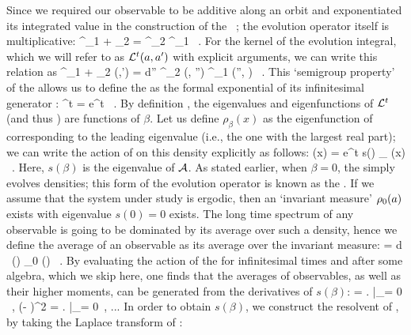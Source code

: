 Since we required our observable to be additive along an orbit and
exponentiated its integrated value in the construction of the \evOper\
; the evolution operator itself is multiplicative:
\beq
    \Lop^{\zeit_1 + \zeit_2} = \Lop^{\zeit_2} \Lop^{\zeit_1} \, .
    \label{eq-SemiGroup}
\eeq
For the kernel of the evolution integral, which we will refer to as
${\cal L}^{t} (a, a')$ with explicit arguments, we can write this relation
as
\beq
	\Lop^{\zeit_1 + \zeit_2} (\ssp,\ssp') =
    \int d\ssp'' \Lop^{\zeit_2} (\ssp, \ssp'')
                   \Lop^{\zeit_1} (\ssp'', \ssp) \, .
	\label{eq-SemiGroupKernel}
\eeq
This `semigroup property'  of the {\evOper} allows us to
define the {\evOper} as the formal exponential of its infinitesimal generator
\Aop :
\beq
	\Lop^t = e^{\Aop t} \, .
	\label{eq-EvOpExp}
\eeq
By definition , the eigenvalues and eigenfunctions of ${\cal L}^t$ (and
thus \Aop ) are functions of $\beta$. Let us define $\rho_{\beta} (x)$ as the
eigenfunction of  corresponding to the leading eigenvalue (i.e., the one with the
largest real part); we can write the action of \refeq{e-EvOper} on this density
explicitly as follows:
\beq
     (x) = e^{t s(\beta )} \rho_{\beta} (x)
    \, .
    \label{eq-EigenvalueRel}
\eeq
Here, $s(\beta)$ is the eigenvalue of ${\cal A}$. As stated earlier, when
$\beta = 0$, the {\evOper} simply evolves densities; this form of the evolution
operator is known as the {\FPoper}. If we assume that the system under study is ergodic,
then an `invariant measure' $\rho_0(a)$ exists with eigenvalue
$s(0) = 0$ exists. The long time spectrum of any observable is going to be dominated by
its average over such a density, hence we define the average of an observable
as its average over the invariant measure:
\beq
    \langle \obser \rangle = \int d \ssp \, \obser(\ssp) \rho_0 (\ssp) \, .
    \label{e-obserAvg}
\eeq
By evaluating the action of the {\evOper}  for infinitesimal
times and after some algebra, which we skip here, one finds that the
averages of observables, as well as their higher moments, can be generated from the
derivatives of $s(\beta)$:
\beq
    \langle \obser \rangle =
        \left.  \right|_{\beta = 0} \, , \quad
    \langle (\obser - \langle \obser \rangle )^2 \rangle =
        \left.  \right|_{\beta = 0} \,, ...
    \label{eq-moments}
\eeq
In order to obtain $s(\beta)$, we construct the resolvent of \Aop , by taking
the Laplace transform of \refeq{eq-EvOpExp}:
